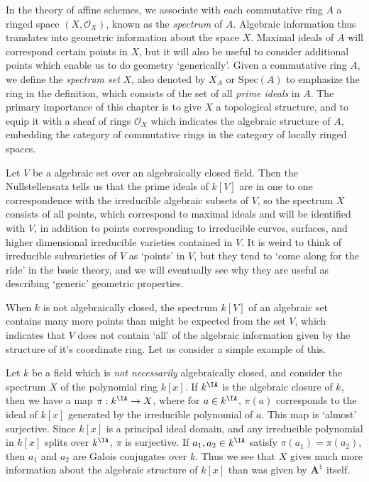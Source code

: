 In the theory of affine schemes, we associate with each commutative ring $A$ a ringed space $(X,\mathcal{O}_X)$, known as the \emph{spectrum} of $A$. Algebraic information thus translates into geometric information about the space $X$. Maximal ideals of $A$ will correspond certain points in $X$, but it will also be useful to consider additional points which enable us to do geometry `generically'. Given a commutative ring $A$, we define the \emph{spectrum set} $X$, also denoted by $X_A$ or $\text{Spec}(A)$ to emphasize the ring in the definition, which consists of the set of all \emph{prime ideals} in $A$.
The primary importance of this chapter is to give $X$ a topological structure, and to equip it with a sheaf of rings $\mathcal{O}_X$ which indicates the algebraic structure of $A$, embedding the category of commutative rings in the category of locally ringed spaces.

\begin{example}
    Let $V$ be a algebraic set over an algebraically closed field. Then the Nullstellensatz tells us that the prime ideals of $k[V]$ are in one to one correspondence with the irreducible algebraic subsets of $V$, so the spectrum $X$ consists of all points, which correspond to maximal ideals and will be identified with $V$, in addition to points corresponding to irreducible curves, surfaces, and higher dimensional irreducible varieties contained in $V$. It is weird to think of irreducible subvarieties of $V$ as `points' in $V$, but they tend to `come along for the ride' in the basic theory, and we will eventually see why they are useful as describing `generic' geometric properties.
\end{example}

When $k$ is not algebraically closed, the spectrum $k[V]$ of an algebraic set contains many more points than might be expected from the set $V$, which indicates that $V$ does not contain `all' of the algebraic information given by the structure of it's coordinate ring. Let us consider a simple example of this.

\begin{example}
    Let $k$ be a field which is \emph{not necessarily} algebraically closed, and consider the spectrum $X$ of the polynomial ring $k[x]$. If $k^{\IA}$ is the algebraic closure of $k$, then we have a map $\pi: k^{\IA} \to X$, where for $a \in k^{\IA}$, $\pi(a)$ corresponds to the ideal of $k[x]$ generated by the irreducible polynomial of $a$. This map is `almost' surjective. Since $k[x]$ is a principal ideal domain, and any irreducible polynomial in $k[x]$ splits over $k^{\IA}$, $\pi$ is surjective. If $a_1,a_2 \in k^{\IA}$ satisfy $\pi(a_1) = \pi(a_2)$, then $a_1$ and $a_2$ are Galois conjugates over $k$. Thus we see that $X$ gives much more information about the algebraic structure of $k[x]$ than was given by $\mathbf{A}^1$ itself.
\end{example}

